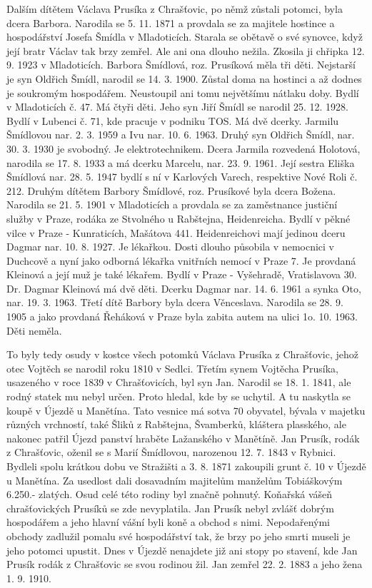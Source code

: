 \documentclass[../dejiny-rodu-prusiku.tex]{subfiles}
\begin{document}
Dalším dítětem Václava Prusíka z Chrašťovic, po němž zůstali potomci, byla dcera Barbora. Narodila se 5. 11. 1871 a provdala se za majitele hostince a hospodářství Josefa Šmídla v Mladoticích. Starala se obětavě o své synovce, když její bratr Václav tak brzy zemřel. Ale ani ona dlouho nežila. Zkosila ji chřipka 12. 9. 1923 v Mladoticích. Barbora Šmídlová, roz. Prusíková měla tři děti. Nejstarší je syn Oldřich Šmídl, narodil se 14. 3. 1900. Zůstal doma na hostinci a až dodnes je soukro­mým hospodářem. Neustoupil ani tomu největšímu nátlaku doby. Bydlí v Mladoticích č. 47. Má čtyři děti. Jeho syn Jiří Šmídl se narodil 25. 12. 1928. Bydlí v Lubenci č. 71, kde pracuje v podniku TOS. Má dvě dcerky. Jarmilu Šmídlovou nar. 2. 3. 1959 a Ivu nar. 10. 6. 1963. Druhý syn Oldřich Šmídl, nar. 30. 3. 1930 je svobodný. Je elektrotechnikem. Dcera Jarmila rozvedená Holotová, narodila se 17. 8. 1933 a má dcerku Marcelu, nar. 23. 9. 1961. Její sestra Eliška Šmídlová nar. 28. 5. 1947 bydlí s ní v Karlových Varech, respektive Nové Roli č. 212.
Druhým dítětem Barbory Šmídlové, roz. Prusíkové byla dcera Božena. Narodila se 21. 5. 1901 v Mladoticích a provdala se za zaměstnance justiční služby v Praze, rodáka ze Stvolného u Rabštejna, Heidenreicha. Bydlí v pěkné vilce v Praze - Kunraticích, Mašátova 441. Heidenreichovi mají jedinou dceru Dagmar nar. 10. 8. 1927. Je lékařkou. Dosti dlouho působila v nemocnici v Duchcově a nyní jako odborná lékařka vnitřních nemocí v Praze 7. Je provdaná Kleinová a její muž je také lékařem. Bydlí v Praze - Vyšehradě, Vratislavova 30. Dr. Dagmar Kleinová má dvě děti. Dcerku Dagmar nar. 14. 6. 1961 a synka Oto, nar. 19. 3. 1963. Třetí dítě Barbory byla dcera Věnceslava. Narodila se 28. 9. 1905 a jako provdaná Řeháková v Praze byla zabita autem na ulici 1o. 10. 1963. Děti neměla.

To byly tedy osudy v kostce všech potomků Václava Prusíka z Chrašťovic, jehož otec Vojtěch se narodil roku 1810 v Sedlci.
Třetím synem Vojtěcha Prusíka, usazeného v roce 1839 v Chrašťovicích, byl syn Jan. Narodil se 18. 1. 1841, ale rodný statek mu nebyl určen. Proto hledal, kde by se uchytil. A tu naskytla se koupě v Újezdě u Manětína. Tato vesnice má sotva 70 obyvatel, bývala v majetku různých vrchností, také Šliků z Rabštejna, Švamberků, kláštera plasského, ale nakonec patřil Újezd panství hraběte Lažanského v Manětíně. Jan Prusík, rodák z Chrašťovic, oženil se s Marií Šmídlovou, narozenou 12. 7. 1843 v Rybnici. Bydleli spolu krátkou dobu ve Stražišti a 3. 8. 1871 zakoupili grunt č. 10 v Újezdě u Manětína. Za usedlost dali dosavadním majitelům manželům Tobiáškovým 6.250.- zlatých. Osud celé této rodiny byl značně pohnutý. Koňařská vášeň chrašťovických Prusíků se zde nevyplatila. Jan Prusík nebyl zvlášť dobrým hospodářem a jeho hlavní vášní byli koně a obchod s nimi. Nepodařenými obchody zadlužil pomalu své hospodářství tak, že brzy po jeho smrti museli je jeho potomci upustit. Dnes v Újezdě nenajdete již ani stopy po stavení, kde Jan Prusík rodák z Chrašťovic se svou rodinou žil. Jan zemřel 22. 2. 1883 a jeho žena 1. 9. 1910.
\end{document}
